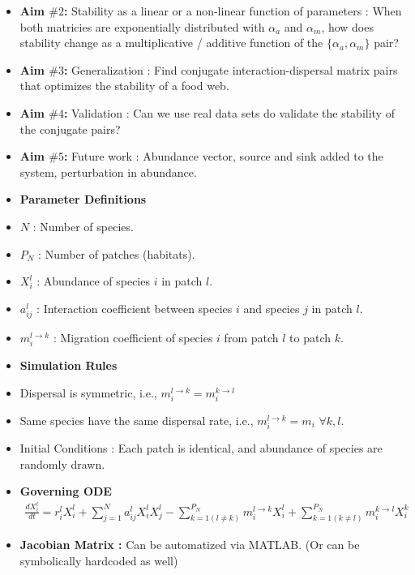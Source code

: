 \documentclass[12pt]{article}
\begin{document}
\begin{itemize}
\item \textbf{Aim $\#2$: } Stability as a linear or a non-linear function of parameters : When both matricies are exponentially distributed with $\alpha_a$ and $\alpha_m$, how does stability change as a multiplicative / additive function of the $\{\alpha_a,\alpha_m\}$ pair?
\item \textbf{Aim $\#3$: } Generalization : Find conjugate interaction-dispersal matrix pairs that optimizes the stability of a food web.
\item \textbf{Aim $\#4$: } Validation : Can we use real data sets do validate the stability of the conjugate pairs?
\item \textbf{Aim $\#5$: } Future work :  Abundance vector, source and sink added to the system, perturbation in abundance.
\item [] \textbf{Parameter Definitions}
\item $N$ : Number of species.
\item $P_N$ : Number of patches (habitats). 
\item $X_{i}^{l}$ : Abundance of species $i$ in patch $l$.
\item $a_{ij}^{l}$ : Interaction coefficient between species $i$ and species $j$ in patch $l$.
\item $m_{i}^{l \rightarrow k}$ : Migration coefficient of species $i$ from patch $l$ to patch $k$.
\item [] \textbf{Simulation Rules}
\item Dispersal is symmetric, i.e.,  $m_{i}^{l \rightarrow k}=m_{i}^{k \rightarrow l}$
\item Same species have the same dispersal rate, i.e., $m_{i}^{l \rightarrow k} = m_{i}\,\, \forall k, l.$
\item Initial Conditions : Each patch is identical, and abundance of species are randomly drawn.
\item \textbf{Governing ODE}
\begin{align}
\frac{dX_{i}^{l}}{dt} = r_i^l X_i^l  + \sum_{j=1}^{N}a_{ij}^{l}X_{i}^{l}X_{j}^{l} - \sum_{k=1 (l \neq k)}^{P_N}m_{i}^{l \rightarrow k} X_{i}^{l}+ \sum_{k=1 (k \neq l)}^{P_N}m_{i}^{k \rightarrow l}X_{i}^{k}
\end{align} %
\item \textbf{Jacobian Matrix : }Can be automatized via MATLAB. (Or can be symbolically hardcoded as well) 
\end{itemize}
\end{document}
